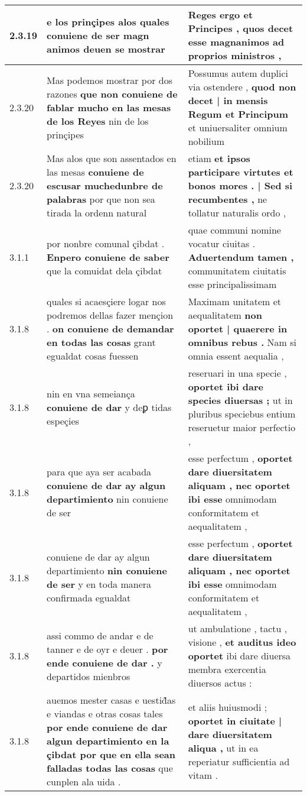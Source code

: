 \begin{tabular}{|p{1cm}|p{6.5cm}|p{6.5cm}|}
2.3.19 & e los prinçipes \textbf{ alos quales conuiene de ser magn animos } deuen se mostrar & Reges ergo et Principes , \textbf{ quos decet esse magnanimos } ad proprios ministros , \\\hline
2.3.20 & Mas podemos mostrar por dos razones \textbf{ que non conuiene de fablar mucho en las mesas de los Reyes } nin de los prinçipes & Possumus autem duplici via ostendere , \textbf{ quod non decet | in mensis Regum et Principum } et uniuersaliter omnium nobilium \\\hline
2.3.20 & Mas alos que son assentados en las mesas \textbf{ conuiene de escusar muchedunbre de palabras } por que non sea tirada la ordenn natural & etiam \textbf{ et ipsos participare virtutes et bonos mores . | Sed si recumbentes , } ne tollatur naturalis ordo , \\\hline
3.1.1 & por nonbre comunal çibdat . \textbf{ Enpero conuiene de saber } que la comuidat dela çibdat & quae communi nomine vocatur ciuitas . \textbf{ Aduertendum tamen , } communitatem ciuitatis esse principalissimam \\\hline
3.1.8 & quales si acaesçiere logar nos podremos dellas fazer mençion . \textbf{ on conuiene de demandar en todas las cosas } grant egualdat cosas fuessen & Maximam unitatem et aequalitatem \textbf{ non oportet | quaerere in omnibus rebus . } Nam si omnia essent aequalia , \\\hline
3.1.8 & nin en vna semeiança \textbf{ conuiene de dar } y deꝑ tidas espeçies & reseruari in una specie , \textbf{ oportet ibi dare species diuersas ; } ut in pluribus speciebus entium reseruetur maior perfectio , \\\hline
3.1.8 & para que aya ser acabada \textbf{ conuiene de dar ay algun departimiento } nin conuiene de ser & esse perfectum , \textbf{ oportet dare diuersitatem aliquam , nec oportet ibi esse } omnimodam conformitatem et aequalitatem , \\\hline
3.1.8 & conuiene de dar ay algun departimiento \textbf{ nin conuiene de ser } y en toda manera confirmada egualdat & esse perfectum , \textbf{ oportet dare diuersitatem aliquam , nec oportet ibi esse } omnimodam conformitatem et aequalitatem , \\\hline
3.1.8 & assi commo de andar e de tanner e de oyr e deuer . \textbf{ por ende conuiene de dar . } y departidos mienbros & ut ambulatione , tactu , visione , \textbf{ et auditus ideo oportet } ibi dare diuersa membra exercentia diuersos actus : \\\hline
3.1.8 & auemos mester casas e uestid̃as e viandas e otras cosas tales \textbf{ por ende conuiene de dar algun departimiento en la çibdat por que en ella sean falladas todas las cosas } que cunplen ala uida . & et aliis huiusmodi ; \textbf{ oportet in ciuitate | dare diuersitatem aliqua , } ut in ea reperiatur sufficientia ad vitam . \\\hline

\end{tabular}
